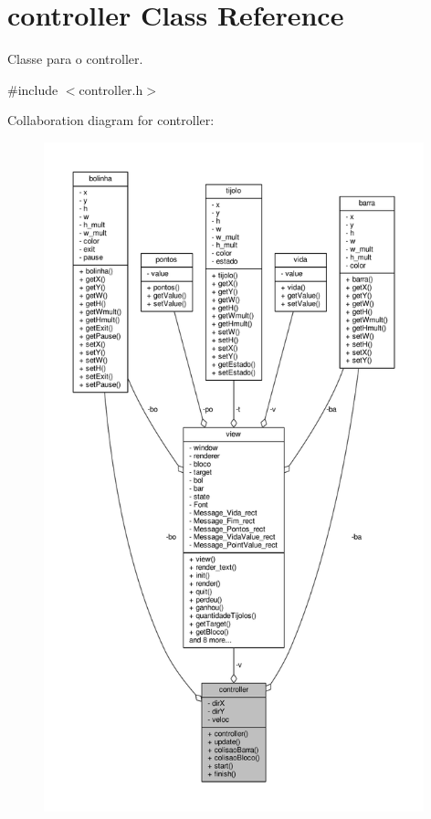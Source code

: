 \hypertarget{classcontroller}{}\section{controller Class Reference}
\label{classcontroller}


Classe para o controller.  




{\ttfamily \#include $<$controller.\+h$>$}



Collaboration diagram for controller\+:\nopagebreak
\begin{figure}[H]
\begin{center}
\leavevmode
\includegraphics[height=550pt]{classcontroller__coll__graph}
\end{center}
\end{figure}
